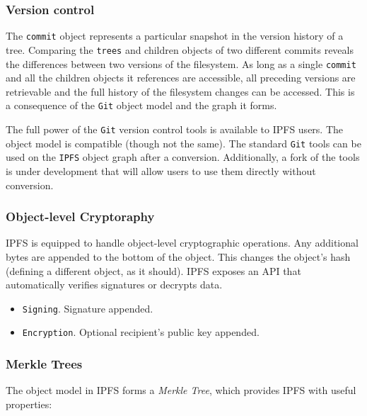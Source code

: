\documentclass{sig-alternate}
\begin{document}
\subsubsection{Version control}

The \texttt{commit} object represents a particular snapshot in the version
history of a tree. Comparing the \texttt{trees} and children objects of two
different commits reveals the differences between two versions of the
filesystem. As long as a single \texttt{commit} and all the children objects
it references are accessible, all preceding versions are retrievable and the
full history of the filesystem changes can be accessed. This is a consequence
of the \texttt{Git} object model and the graph it forms.

The full power of the \texttt{Git} version control tools is available to IPFS
users. The object model is compatible (though not the same). The standard
\texttt{Git} tools can be used on the \texttt{IPFS} object graph after a
conversion. Additionally, a fork of the tools is under development that will
allow users to use them directly without conversion.

\subsubsection{Object-level Cryptoraphy}

IPFS is equipped to handle object-level cryptographic operations. Any additional
bytes are appended to the bottom of the object. This changes the object's hash
(defining a different object, as it should). IPFS exposes an API that
automatically verifies signatures or decrypts data.

\begin{itemize}
  \item \texttt{Signing}. Signature appended.
  \item \texttt{Encryption}. Optional recipient's public key appended.
\end{itemize}

\subsubsection{Merkle Trees}

The object model in IPFS forms a \textit{Merkle Tree}, which provides IPFS with
useful properties:
\end{document}
